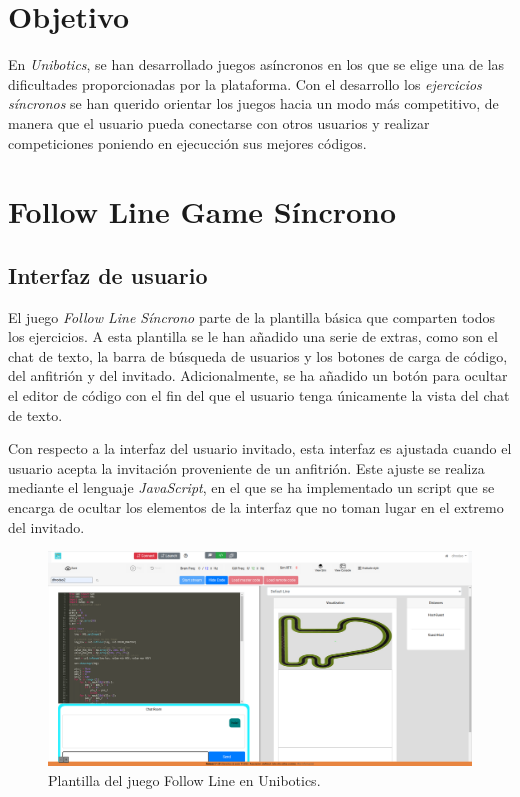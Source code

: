 \documentclass[a4paper, 12pt]{book}
\begin{document}
\section{Objetivo}
\label{sync_objective}

En \emph{Unibotics}, se han desarrollado juegos asíncronos en los que se elige una de las dificultades proporcionadas por la plataforma. Con el desarrollo los \emph{ejercicios síncronos} se han querido orientar los juegos hacia un modo más competitivo, de manera que el usuario pueda conectarse con otros usuarios y realizar competiciones poniendo en ejecucción sus mejores códigos.

\section{Follow Line Game Síncrono} 
\label{sec:follow_line_game_sync}

\subsection{Interfaz de usuario}

El juego \emph{Follow Line Síncrono} parte de la plantilla básica que comparten todos los ejercicios. A esta plantilla se le han añadido una serie de extras, como son el chat de texto, la barra de búsqueda de usuarios y los botones de carga de código, del anfitrión y del invitado. Adicionalmente, se ha añadido un botón para ocultar el editor de código con el fin del que el usuario tenga únicamente la vista del chat de texto.

Con respecto a la interfaz del usuario invitado, esta interfaz es ajustada cuando el usuario acepta la invitación proveniente de un anfitrión. Este ajuste se realiza mediante el lenguaje \emph{JavaScript}, en el que se ha implementado un script que se encarga de ocultar los elementos de la interfaz que no toman lugar en el extremo del invitado.
\begin{figure}[H]
	\centering
    \includegraphics[width=15cm]{img/follow_line_game_sync.png}
    \caption{Plantilla del juego Follow Line en Unibotics.}
    \label{figura:diagrama_conexion_webrtc}
\end{figure}
\end{document}
